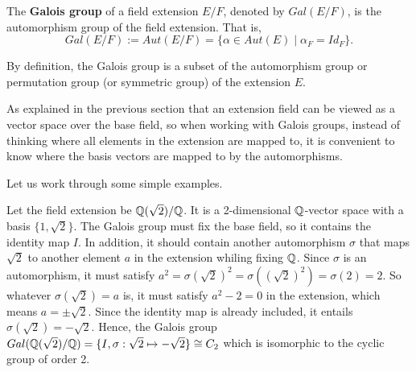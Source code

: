 \documentclass[../main.tex]{subfiles}
\begin{document}
\begin{definition}
The \textbf{Galois group} of a field extension $E/F$, denoted by $Gal(E/F)$, is the automorphism group of the field extension.\reversemarginpar
{}
That is, 
\begin{equation*}
    Gal(E/F):=Aut(E/F) = \{\alpha \in Aut(E) \mid \alpha_F = Id_F\}.
\end{equation*}
\end{definition}

By definition, the Galois group is a subset of the automorphism group or permutation group (or symmetric group) of the extension $E$. 

As explained in the previous section that an extension field can be viewed as a vector space over the base field, so when working with Galois groups, instead of thinking where all elements in the extension are mapped to, it is convenient to know where the basis vectors are mapped to by the automorphisms.

Let us work through some simple examples. 
\begin{example}
Let the field extension be $\mathbb{Q}(\sqrt{2})/\mathbb{Q}$. It is a 2-dimensional $\mathbb{Q}$-vector space with a basis $\{1,\sqrt{2}\}$. The Galois group must fix the base field, so it contains the identity map $I$. In addition, it should contain another automorphism $\sigma$ that maps $\sqrt{2}$ to another element $a$ in the extension whiling fixing $\mathbb{Q}$. Since $\sigma$ is an automorphism, it must satisfy $a^2=\sigma(\sqrt{2})^2=\sigma((\sqrt{2})^2)=\sigma(2)=2$. So whatever $\sigma(\sqrt{2})=a$ is, it must satisfy $a^2-2=0$ in the extension, which means $a=\pm \sqrt{2}$. Since the identity map is already included, it entails $\sigma(\sqrt{2})=-\sqrt{2}$. Hence, the Galois group $Gal(\mathbb{Q}(\sqrt{2})/\mathbb{Q}) = \{I, \sigma:\sqrt{2} \mapsto -\sqrt{2}\} \cong C_2$ which is isomorphic to the cyclic group of order 2. 
\end{example}
\end{document}
